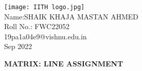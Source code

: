 \documentclass[10pt,a4paper]{report}
\begin{document}
\begin{multicols}{2}
\raggedright {\texttt{[image: IITH logo.jpg]}} \vspace{3mm}\\ \raggedleft Name:SHAIK KHAJA MASTAN AHMED\vspace{2mm}\\ \raggedleft Roll No.: FWC22052\vspace{2mm}\\ \raggedleft 19pa1a04e9@vishnu.edu.in \vspace{2mm}\\ \raggedleft Sep 2022 \vspace{5mm}\\

\end{multicols}
\centering \Large \textbf{MATRIX: LINE ASSIGNMENT} \normalsize \vspace{10mm}
\end{document}
